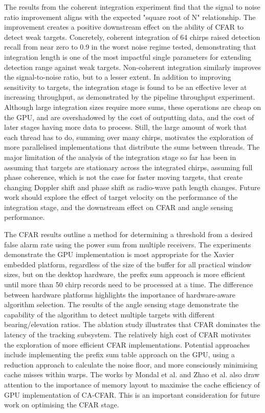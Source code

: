 The results from the coherent integration experiment find
that the signal
to noise ratio improvement aligns with the expected "square root of N" relationship. 
The improvement creates a positive downstream effect on the
ability of CFAR to detect weak
targets. Concretely, coherent integration of 64 chirps raised detection recall
from near zero to 0.9 in the worst noise regime tested, demonstrating that
integration length is one of the most impactful single parameters for extending
detection range against weak targets. Non-coherent integration similarly improves the signal-to-noise
ratio, but to a lesser extent. In addition to improving sensitivity to targets,
the integration stage is found to be 
an effective lever at increasing throughput, as demonstrated by the pipeline
throughput experiment. Although large integration sizes require more sums, 
these operations are cheap on the GPU, and are overshadowed by the cost of 
outputting data, and the cost of later stages having more data to process.  
Still, the large amount of work that each thread has to 
do, summing over many chirps, motivates the exploration of more parallelised 
implementations that distribute the sums between threads. The major limitation
of the analysis of the integration stage so far has been in assuming that 
targets are stationary across the integrated chirps, assuming full
phase coherence, which is not the case for faster moving targets, 
that create changing Doppler shift and phase shift as radio-wave path
length changes. Future work should explore the effect of target velocity 
on the performance of the integration stage, and the downstream effect 
on CFAR and angle sensing performance.

The CFAR results outline a method for determining a threshold from a 
desired false alarm rate using the power sum from multiple receivers. 
The experiments demonstrate the GPU implementation
is most appropriate for the Xavier embedded platform, regardless of the size 
of the buffer for all practical window sizes, but on the desktop hardware, 
the prefix sum approach is more efficient until more than 50 chirp records need to be 
processed at a time. The difference between hardware
platforms highlights the importance of hardware-aware algorithm selection. The 
results of the angle sensing stage demonstrate the capability of the algorithm 
to detect multiple targets with different bearing/elevation ratios. The ablation 
study illustrates that CFAR dominates the latency 
of the tracking subsystem. The relatively high cost of CFAR motivates the 
exploration
of more efficient CFAR implementations. Potential approaches include implementing 
the prefix sum table approach on the GPU, using a reduction approach to calculate the 
noise floor, and more consciously minimising cache misses within warps. The works
by Mondal et al. \cite{Mondal2024_gpu_radar} and Zhao et al. \cite{rs15225421}
also draw attention to the importance of memory layout to maximise the 
cache efficiency of GPU implementation of CA-CFAR. This is an important
consideration for future work on optimising the CFAR stage. 

